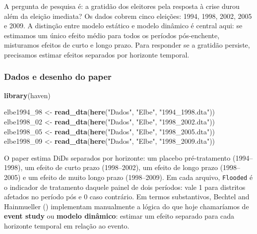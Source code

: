 \documentclass[
]{article}
\newenvironment{Shaded}{\begin{snugshade}}{\end{snugshade}}
\newcommand{\FunctionTok}[1]{\textcolor[rgb]{0.13,0.29,0.53}{\textbf{#1}}}
\newcommand{\NormalTok}[1]{#1}
\newcommand{\OtherTok}[1]{\textcolor[rgb]{0.56,0.35,0.01}{#1}}
\newcommand{\StringTok}[1]{\textcolor[rgb]{0.31,0.60,0.02}{#1}}
\begin{document}
A pergunta de pesquisa é: a gratidão dos eleitores pela resposta à crise durou além da eleição imediata? Os dados cobrem cinco eleições: 1994, 1998, 2002, 2005 e 2009. A distinção entre modelo estático e modelo dinâmico é central aqui: se estimamos um único efeito médio para todos os períodos pós-enchente, misturamos efeitos de curto e longo prazo. Para responder se a gratidão persiste, precisamos estimar efeitos separados por horizonte temporal.

\subsubsection{Dados e desenho do paper}\label{dados-e-desenho-do-paper}

\begin{Shaded}
\begin{Highlighting}[]
\FunctionTok{library}\NormalTok{(haven)}

\NormalTok{elbe1994\_98 }\OtherTok{\textless{}{-}} \FunctionTok{read\_dta}\NormalTok{(}\FunctionTok{here}\NormalTok{(}\StringTok{"Dados"}\NormalTok{, }\StringTok{"Elbe"}\NormalTok{, }\StringTok{"1994\_1998.dta"}\NormalTok{))}
\NormalTok{elbe1998\_02 }\OtherTok{\textless{}{-}} \FunctionTok{read\_dta}\NormalTok{(}\FunctionTok{here}\NormalTok{(}\StringTok{"Dados"}\NormalTok{, }\StringTok{"Elbe"}\NormalTok{, }\StringTok{"1998\_2002.dta"}\NormalTok{))}
\NormalTok{elbe1998\_05 }\OtherTok{\textless{}{-}} \FunctionTok{read\_dta}\NormalTok{(}\FunctionTok{here}\NormalTok{(}\StringTok{"Dados"}\NormalTok{, }\StringTok{"Elbe"}\NormalTok{, }\StringTok{"1998\_2005.dta"}\NormalTok{))}
\NormalTok{elbe1998\_09 }\OtherTok{\textless{}{-}} \FunctionTok{read\_dta}\NormalTok{(}\FunctionTok{here}\NormalTok{(}\StringTok{"Dados"}\NormalTok{, }\StringTok{"Elbe"}\NormalTok{, }\StringTok{"1998\_2009.dta"}\NormalTok{))}
\end{Highlighting}
\end{Shaded}

O paper estima DiDs separados por horizonte: um placebo pré-tratamento (1994--1998), um efeito de curto prazo (1998--2002), um efeito de longo prazo (1998--2005) e um efeito de muito longo prazo (1998--2009). Em cada arquivo, \texttt{Flooded} é o indicador de tratamento daquele painel de dois períodos: vale 1 para distritos afetados no período pós e 0 caso contrário. Em termos substantivos, Bechtel and Hainmueller () implementam manualmente a lógica do que hoje chamaríamos de \textbf{event study} ou \textbf{modelo dinâmico}: estimar um efeito separado para cada horizonte temporal em relação ao evento.
\end{document}
